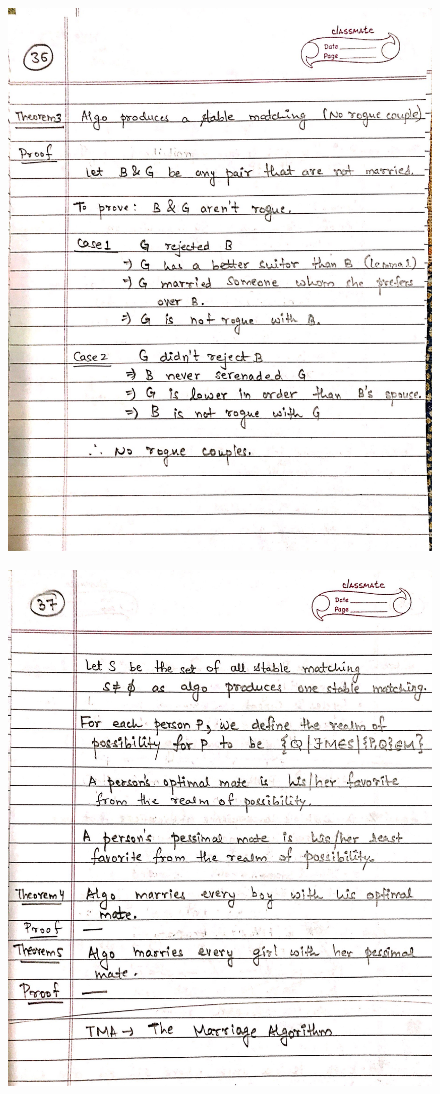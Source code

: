 \begin{figure}[H]
    \centering
    \includegraphics[scale=0.25]{"./MIT 6.042J/MIT_6042J_036"}
\end{figure}
\newpage
\begin{figure}[H]
    \centering
    \includegraphics[scale=0.25]{"./MIT 6.042J/MIT_6042J_037"}
\end{figure}

